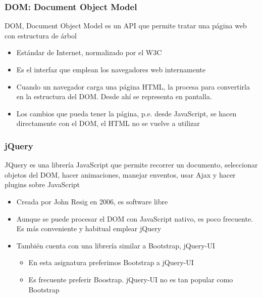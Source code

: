 \documentclass[ucs]{beamer}
\begin{document}
\begin{frame}[fragile]
\frametitle{DOM: Document Object Model}


DOM, Document Object Model es un API que permite tratar una página web con estructura de árbol
\begin{itemize}
\item
Estándar de Internet, normalizado por el W3C

\item
Es el interfaz que emplean los navegadores web internamente

\item
Cuando un navegador carga una página HTML, la procesa para convertirla en la estructura del DOM. Desde ahí se representa en pantalla.

\item
Los cambios que pueda tener la página, p.e. desde JavaScript, se hacen directamente con el DOM, el HTML no se vuelve a utilizar
\end{itemize}

\end{frame}




\begin{frame}[fragile]
\frametitle{jQuery}


JQuery es una librería JavaScript que permite recorrer un documento, seleccionar objetos del DOM, hacer animaciones,
manejar enventos, usar Ajax y hacer plugins sobre JavaScript
    \begin{itemize}
    \item
Creada por John Resig
en 2006, es software libre

    \item
Aunque se puede procesar el DOM con JavaScript nativo, es poco frecuente. Es más conveniente y habitual
emplear jQuery

    \item
También cuenta con una librería similar a Bootstrap, jQuery-UI


    \begin{itemize}
    \item
En esta asignatura preferimos Bootstrap a jQuery-UI
    \item
Es frecuente preferir Boostrap. jQuery-UI no es tan popular como
Bootstrap 
    \end{itemize}
    \end{itemize}

\end{frame}
\end{document}
